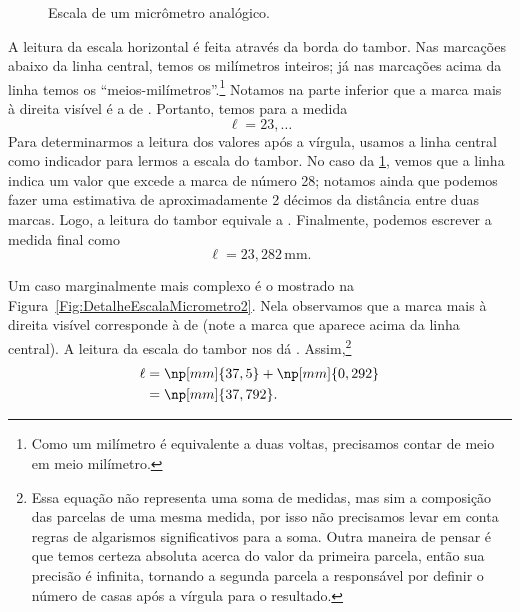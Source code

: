 \begin{figure}
\caption{Escala de um micrômetro analógico.\label{Fig:DetalheEscalaMicrometro}}
\end{figure}

A leitura da escala horizontal é feita através da borda do tambor. Nas marcações abaixo da linha central, temos os milímetros inteiros; já nas marcações acima da linha temos os ``meios-milímetros''.\footnote{Como um milímetro é equivalente a duas voltas, precisamos contar de meio em meio milímetro.} Notamos na parte inferior que a marca mais à direita visível é a de . Portanto, temos para a medida
\begin{equation}
	\ell = 23{,}\dots
\end{equation}
%
Para determinarmos a leitura dos valores após a vírgula, usamos a linha central como indicador para lermos a escala do tambor. No caso da \ref{Fig:DetalheEscalaMicrometro}, vemos que a linha indica um valor que excede a marca de número 28; notamos ainda que podemos fazer uma estimativa de aproximadamente 2 décimos da distância entre duas marcas. Logo, a leitura do tambor equivale a . Finalmente, podemos escrever a medida final como
\begin{equation}
	\ell = 23{,}282\,\text{mm}.
\end{equation}

Um caso marginalmente mais complexo é o mostrado na Figura~\ref{Fig:DetalheEscalaMicrometro2}. Nela observamos que a marca mais à direita visível corresponde à de  (note a marca que aparece acima da linha central). A leitura da escala do tambor nos dá . Assim,\footnote[][-1.5cm]{Essa equação não representa uma soma de medidas, mas sim a composição das parcelas de uma mesma medida, por isso não precisamos levar em conta regras de algarismos significativos para a soma. Outra maneira de pensar é que temos certeza absoluta acerca do valor da primeira parcela, então sua precisão é infinita, tornando a segunda parcela a responsável por definir o número de casas após a vírgula para o resultado.} 
\begin{align}
	\ell &= \np[mm]{37,5} + \np[mm]{0,292} \\
	&= \np[mm]{37,792}.
\end{align}

